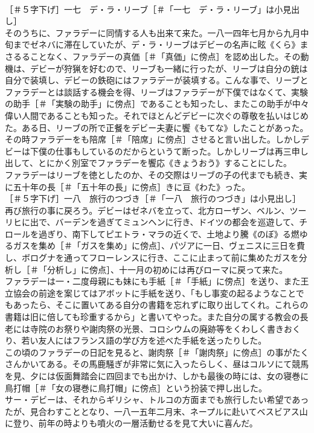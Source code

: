 \documentclass[8pt]{extreport}
\begin{document}
\begin{CJK}{UTF8}{min}
\\	［＃５字下げ］一七　デ・ラ・リーブ［＃「一七　デ・ラ・リーブ」は小見出し］
\\	そのうちに、ファラデーに同情する人も出来て来た。一八一四年七月から九月中旬までゼネバに滞在していたが、デ・ラ・リーブはデビーの名声に眩《くら》まさるることなく、ファラデーの真価［＃「真価」に傍点］を認め出した。その動機は、デビーが狩猟を好むので、リーブも一緒に行ったが、リーブは自分の銃は自分で装填し、デビーの鉄砲にはファラデーが装填する。こんな事で、リーブとファラデーとは談話する機会を得、リーブはファラデーが下僕ではなくて、実験の助手［＃「実験の助手」に傍点］であることも知ったし、またこの助手が中々偉い人間であることも知った。それでほとんどデビーに次ぐの尊敬を払いはじめた。ある日、リーブの所で正餐をデビー夫妻に饗《もてな》したことがあった。その時ファラデーをも陪席［＃「陪席」に傍点］させると言い出した。しかしデビーは下僕の仕事もしているのだからというて断った。しかしリーブは再三申し出して、とにかく別室でファラデーを饗応《きょうおう》することにした。
\\	ファラデーはリーブを徳としたのか、その交際はリーブの子の代までも続き、実に五十年の長［＃「五十年の長」に傍点］きに亘《わた》った。
\\	［＃５字下げ］一八　旅行のつづき［＃「一八　旅行のつづき」は小見出し］
\\	再び旅行の事に戻ろう。デビーはゼネバを立って、北方ローザン、ベルン、ツーリヒに出で、バーデンを過ぎてミュンヘンに行き、ドイツの都会を巡遊して、チロールを過ぎり、南下してピエトラ・マラの近くで、土地より騰《のぼ》る燃ゆるガスを集め［＃「ガスを集め」に傍点］、パヅアに一日、ヴェニスに三日を費し、ボログナを通ってフローレンスに行き、ここに止まって前に集めたガスを分析し［＃「分析し」に傍点］、十一月の初めには再びローマに戻って来た。
\\	ファラデーは一・二度母親にも妹にも手紙［＃「手紙」に傍点］を送り、また王立協会の前途を案じてはアボットに手紙を送り、「もし事変の起るようなことでもあったら、そこに置いてある自分の書籍を忘れずに取り出してくれ。これらの書籍は旧に倍しても珍重するから」と書いてやった。また自分の属する教会の長老には寺院のお祭りや謝肉祭の光景、コロシウムの廃跡等をくわしく書きおくり、若い友人にはフランス語の学び方を述べた手紙を送ったりした。
\\	この頃のファラデーの日記を見ると、謝肉祭［＃「謝肉祭」に傍点］の事がたくさんかいてある。その馬鹿騒ぎが非常に気に入ったらしく、昼はコルソにて競馬を見、夕には仮面舞踏会に四回までも出かけ、しかも最後の時には、女の寝巻に鳥打帽［＃「女の寝巻に鳥打帽」に傍点］という扮装で押し出した。
\\	サー・デビーは、それからギリシャ、トルコの方面までも旅行したい希望であったが、見合わすこととなり、一八一五年二月末、ネープルに赴いてベスビアス山に登り、前年の時よりも噴火の一層活動せるを見て大いに喜んだ。

\end{CJK}
\end{document}
